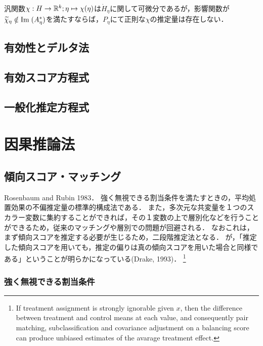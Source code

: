 \documentclass[uplatex,dvipdfmx]{jsreport}
\begin{document}
\begin{corollary}
    汎関数$\chi:H\to\mathbb{R}^k;\eta\mapsto\chi(\eta)$は$\dot{H}_\eta$に関して可微分であるが，影響関数が$\widetilde{\chi}_\eta\notin\mathrm{Im}\;(A^*_\eta)$を満たすならば，$P_\eta$にて正則な$\chi$の推定量は存在しない．
\end{corollary}

\section{有効性とデルタ法}

\section{有効スコア方程式}

\section{一般化推定方程式}

\chapter{因果推論法}

\section{傾向スコア・マッチング}

\begin{tcolorbox}[colframe=ForestGreen, colback=ForestGreen!10!white,breakable,colbacktitle=ForestGreen!40!white,coltitle=black,fonttitle=\bfseries\sffamily,
title=]
    Rosenbaum and Rubin 1983．
    強く無視できる割当条件を満たすときの，平均処置効果の不偏推定量の標準的構成法である．
    また，多次元な共変量を１つのスカラー変数に集約することができれば，その１変数の上で層別化などを行うことができるため，従来のマッチングや層別での問題が回避される．
    なおこれは，まず傾向スコアを推定する必要が生じるため，二段階推定法となる．
    が，「推定した傾向スコアを用いても，推定の偏りは真の傾向スコアを用いた場合と同様である」ということが明らかになっている(Drake, 1993)．
    \footnote{If treatment assignment is strongly ignorable given $x$, then the difference between treatment and control means at each value, and consequently pair matching, subclassification and covariance adjustment on a balancing score can produce unbiased estimates of the avarage treatment effect.}
\end{tcolorbox}

\subsection{強く無視できる割当条件}
\end{document}
